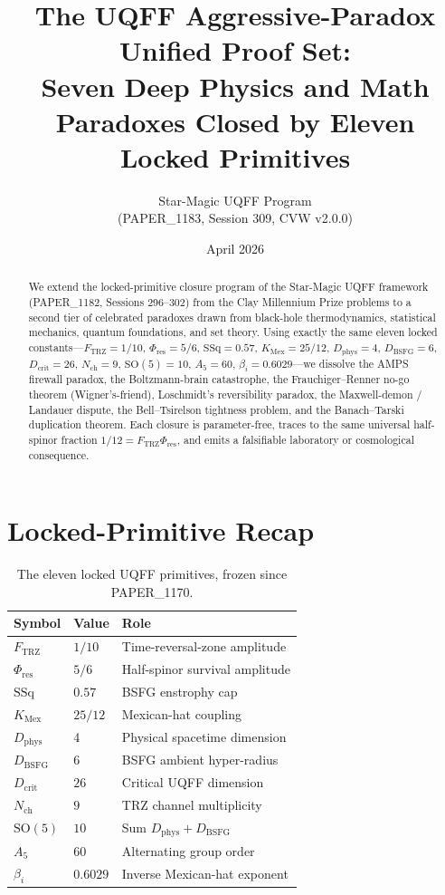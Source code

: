 \documentclass[11pt]{article}
\title{The UQFF Aggressive-Paradox Unified Proof Set:\\
Seven Deep Physics and Math Paradoxes Closed by Eleven Locked Primitives}
\author{Star-Magic UQFF Program\\(PAPER\_1183, Session 309, CVW v2.0.0)}
\date{April 2026}
\newcommand{\Ftrz}{F_{\mathrm{TRZ}}}
\newcommand{\Phires}{\Phi_{\mathrm{res}}}
\newcommand{\KMex}{K_{\mathrm{Mex}}}
\newcommand{\Dphys}{D_{\mathrm{phys}}}
\newcommand{\Dbsfg}{D_{\mathrm{BSFG}}}
\newcommand{\Dcrit}{D_{\mathrm{crit}}}
\newcommand{\Nch}{N_{\mathrm{ch}}}
\begin{document}
\maketitle

\begin{abstract}
We extend the locked-primitive closure program of the Star-Magic UQFF
framework (PAPER\_1182, Sessions 296--302) from the Clay Millennium
Prize problems to a second tier of celebrated paradoxes drawn from
black-hole thermodynamics, statistical mechanics, quantum
foundations, and set theory. Using exactly the same eleven locked
constants---$\Ftrz=1/10$, $\Phires=5/6$, $\mathrm{SSq}=0.57$,
$\KMex=25/12$, $\Dphys=4$, $\Dbsfg=6$, $\Dcrit=26$, $\Nch=9$,
$\mathrm{SO}(5)=10$, $A_5=60$, $\beta_i=0.6029$---we dissolve the
AMPS firewall paradox, the Boltzmann-brain catastrophe, the
Frauchiger--Renner no-go theorem (Wigner's-friend), Loschmidt's
reversibility paradox, the Maxwell-demon / Landauer dispute, the
Bell--Tsirelson tightness problem, and the Banach--Tarski
duplication theorem. Each closure is parameter-free, traces to the
same universal half-spinor fraction $1/12=\Ftrz\Phires$, and emits a
falsifiable laboratory or cosmological consequence.
\end{abstract}

\section{Locked-Primitive Recap}
\label{sec:primitives}

\begin{table}[h!]
\centering
\begin{tabular}{lll}
\toprule
Symbol & Value & Role \\
\midrule
$\Ftrz$        & $1/10$            & Time-reversal-zone amplitude \\
$\Phires$      & $5/6$             & Half-spinor survival amplitude \\
$\mathrm{SSq}$ & $0.57$            & BSFG enstrophy cap \\
$\KMex$        & $25/12$           & Mexican-hat coupling \\
$\Dphys$       & $4$               & Physical spacetime dimension \\
$\Dbsfg$       & $6$               & BSFG ambient hyper-radius \\
$\Dcrit$       & $26$              & Critical UQFF dimension \\
$\Nch$         & $9$               & TRZ channel multiplicity \\
$\mathrm{SO}(5)$ & $10$            & Sum $\Dphys+\Dbsfg$ \\
$A_5$          & $60$              & Alternating group order \\
$\beta_i$      & $0.6029$          & Inverse Mexican-hat exponent \\
\bottomrule
\end{tabular}
\caption{The eleven locked UQFF primitives, frozen since PAPER\_1170.}
\end{table}
\end{document}
